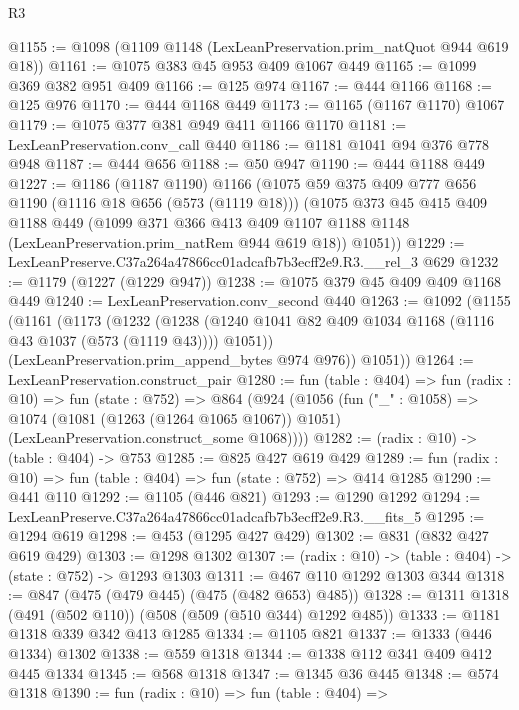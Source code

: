 \begin{lexlean}{R3}
\begin{coremodule}
@1155 := @1098 (@1109 @1148 (LexLeanPreservation.prim_natQuot @944 @619 @18))
@1161 := @1075 @383 @45 @953 @409 @1067 @449
@1165 := @1099 @369 @382 @951 @409
@1166 := @125 @974
@1167 := @444 @1166
@1168 := @125 @976
@1170 := @444 @1168 @449
@1173 := @1165 (@1167 @1170) @1067
@1179 := @1075 @377 @381 @949 @411 @1166 @1170
@1181 := LexLeanPreservation.conv_call @440
@1186 := @1181 @1041 @94 @376 @778 @948
@1187 := @444 @656
@1188 := @50 @947
@1190 := @444 @1188 @449
@1227 := @1186
    (@1187 @1190)
    @1166
    (@1075
      @59
      @375
      @409
      @777
      @656
      @1190
      (@1116 @18 @656 (@573 (@1119 @18)))
      (@1075
        @373
        @45
        @415
        @409
        @1188
        @449
        (@1099
          @371
          @366
          @413
          @409
          @1107
          @1188
          @1148
          (LexLeanPreservation.prim_natRem @944 @619 @18))
        @1051))
@1229 := LexLeanPreserve.C37a264a47866cc01adcafb7b3ecff2e9.R3.__rel_3 @629
@1232 := @1179 (@1227 (@1229 @947))
@1238 := @1075 @379 @45 @409 @409 @1168 @449
@1240 := LexLeanPreservation.conv_second @440
@1263 := @1092
    (@1155
      (@1161
        (@1173
          (@1232
            (@1238 (@1240 @1041 @82 @409 @1034 @1168 (@1116 @43 @1037 (@573 (@1119 @43)))) @1051))
          (LexLeanPreservation.prim_append_bytes @974 @976))
        @1051))
@1264 := LexLeanPreservation.construct_pair
@1280 := fun (table : @404) =>
  fun (radix : @10) =>
  fun (state : @752) =>
  @864
    (@924
      (@1056
        (fun ("_" : @1058) =>
        @1074
          (@1081 (@1263 (@1264 @1065 @1067)) @1051)
          (LexLeanPreservation.construct_some @1068))))
@1282 := (radix : @10) -> (table : @404) -> @753
@1285 := @825 @427 @619 @429
@1289 := fun (radix : @10) => fun (table : @404) => fun (state : @752) => @414 @1285
@1290 := @441 @110
@1292 := @1105 (@446 @821)
@1293 := @1290 @1292
@1294 := LexLeanPreserve.C37a264a47866cc01adcafb7b3ecff2e9.R3.__fits_5
@1295 := @1294 @619
@1298 := @453 (@1295 @427 @429)
@1302 := @831 (@832 @427 @619 @429)
@1303 := @1298 @1302
@1307 := (radix : @10) -> (table : @404) -> (state : @752) -> @1293 @1303
@1311 := @467 @110 @1292 @1303 @344
@1318 := @847 (@475 (@479 @445) (@475 (@482 @653) @485))
@1328 := @1311 @1318 (@491 (@502 @110)) (@508 (@509 (@510 @344) @1292 @485))
@1333 := @1181 @1318 @339 @342 @413 @1285
@1334 := @1105 @821
@1337 := @1333 (@446 @1334) @1302
@1338 := @559 @1318
@1344 := @1338 @112 @341 @409 @412 @445 @1334
@1345 := @568 @1318
@1347 := @1345 @36 @445
@1348 := @574 @1318
@1390 := fun (radix : @10) =>
  fun (table : @404) =>

\end{coremodule}
\end{lexlean}
